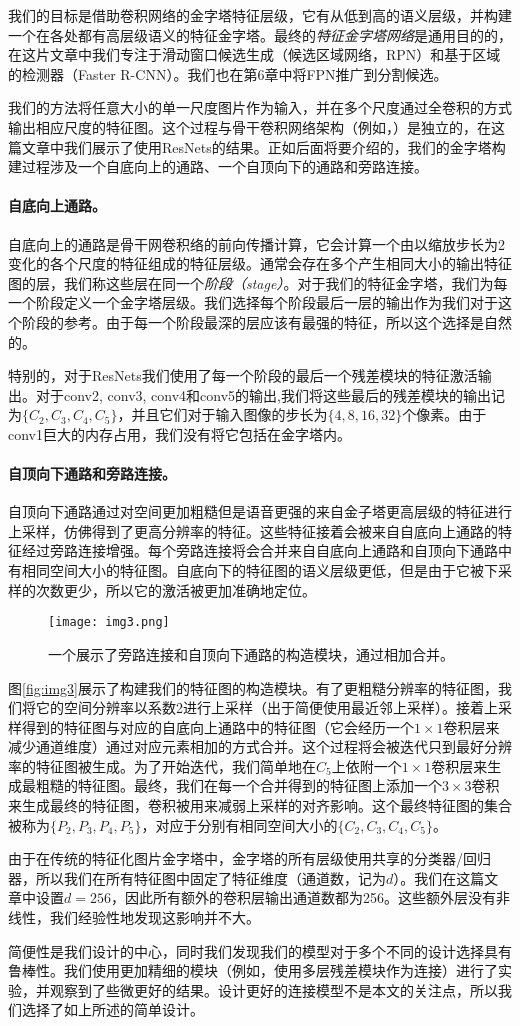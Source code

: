 \documentclass[../main.tex]{subfile}
\begin{document}
我们的目标是借助卷积网络的金字塔特征层级，它有从低到高的语义层级，并构建一个在各处都有高层级语义的特征金字塔。最终的\textit{特征金字塔网络}是通用目的的，在这片文章中我们专注于滑动窗口候选生成（候选区域网络，RPN）和基于区域的检测器（Faster R-CNN）。我们也在第6章中将FPN推广到分割候选。

我们的方法将任意大小的单一尺度图片作为输入，并在多个尺度通过全卷积的方式输出相应尺度的特征图。这个过程与骨干卷积网络架构（例如，\cite{19,36,16}）是独立的，在这篇文章中我们展示了使用ResNets\cite{resnet}的结果。正如后面将要介绍的，我们的金字塔构建过程涉及一个自底向上的通路、一个自顶向下的通路和旁路连接。

\paragraph{自底向上通路。}自底向上的通路是骨干网卷积络的前向传播计算，它会计算一个由以缩放步长为2变化的各个尺度的特征组成的特征层级。通常会存在多个产生相同大小的输出特征图的层，我们称这些层在同一个\textit{阶段（stage）}。对于我们的特征金字塔，我们为每一个阶段定义一个金字塔层级。我们选择每个阶段最后一层的输出作为我们对于这个阶段的参考。由于每一个阶段最深的层应该有最强的特征，所以这个选择是自然的。

特别的，对于ResNets\cite{resnet}我们使用了每一个阶段的最后一个残差模块的特征激活输出。对于conv2, conv3, conv4和conv5的输出,我们将这些最后的残差模块的输出记为$\{C_2, C_3,C_4,C_5\}$，并且它们对于输入图像的步长为$\{4, 8, 16, 32\}$个像素。由于conv1巨大的内存占用，我们没有将它包括在金字塔内。

\paragraph{自顶向下通路和旁路连接。}自顶向下通路通过对空间更加粗糙但是语音更强的来自金子塔更高层级的特征进行上采样，仿佛得到了更高分辨率的特征。这些特征接着会被来自自底向上通路的特征经过旁路连接增强。每个旁路连接将会合并来自自底向上通路和自顶向下通路中有相同空间大小的特征图。自底向下的特征图的语义层级更低，但是由于它被下采样的次数更少，所以它的激活被更加准确地定位。

\begin{figure}[bh]
    \centering
    \texttt{[image: img3.png]}
    \caption{一个展示了旁路连接和自顶向下通路的构造模块，通过相加合并。}
    \label{fig:img1}
\end{figure}

图\ref{fig:img3}展示了构建我们的特征图的构造模块。有了更粗糙分辨率的特征图，我们将它的空间分辨率以系数2进行上采样（出于简便使用最近邻上采样）。接着上采样得到的特征图与对应的自底向上通路中的特征图（它会经历一个$1\times 1$卷积层来减少通道维度）通过对应元素相加的方式合并。这个过程将会被迭代只到最好分辨率的特征图被生成。为了开始迭代，我们简单地在$C_5$上依附一个$1\times 1$卷积层来生成最粗糙的特征图。最终，我们在每一个合并得到的特征图上添加一个$3\times 3$卷积来生成最终的特征图，卷积被用来减弱上采样的对齐影响。这个最终特征图的集合被称为$\{P_2,P_3,P_4,P_5\}$，对应于分别有相同空间大小的$\{C_2,C_3,C_4, C_5\}$。

由于在传统的特征化图片金字塔中，金字塔的所有层级使用共享的分类器/回归器，所以我们在所有特征图中固定了特征维度（通道数，记为$d$）。我们在这篇文章中设置$d=256$，因此所有额外的卷积层输出通道数都为256。这些额外层没有非线性，我们经验性地发现这影响并不大。

简便性是我们设计的中心，同时我们发现我们的模型对于多个不同的设计选择具有鲁棒性。我们使用更加精细的模块（例如，使用多层残差模块\cite{resnet}作为连接）进行了实验，并观察到了些微更好的结果。设计更好的连接模型不是本文的关注点，所以我们选择了如上所述的简单设计。
\end{document}
